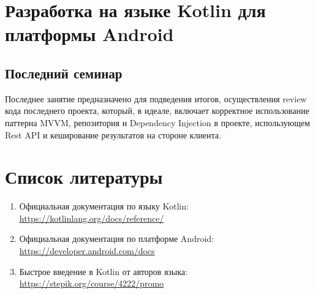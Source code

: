 \documentclass{article}
\begin{document}















%

\section{Разработка на языке Kotlin для платформы Android}



%



%
%
%
%
%
%
%














\subsection{Последний семинар}

Последнее занятие предназначено для подведения итогов, осуществления review кода последнего проекта, который, в идеале, включает корректное использование паттерна
MVVM, репозитория и Dependency Injection в проекте, использующем Rest API и кеширование результатов на стороне клиента.

\section{Список литературы}

\begin{enumerate}
	\item Официальная документация по языку Kotlin: \url{https://kotlinlang.org/docs/reference/}
	\item Официальная документация по платформе Android: \url{https://developer.android.com/docs}
	\item Быстрое введение в Kotlin от авторов языка: \url{https://stepik.org/course/4222/promo}
\end{enumerate}
\end{document}
